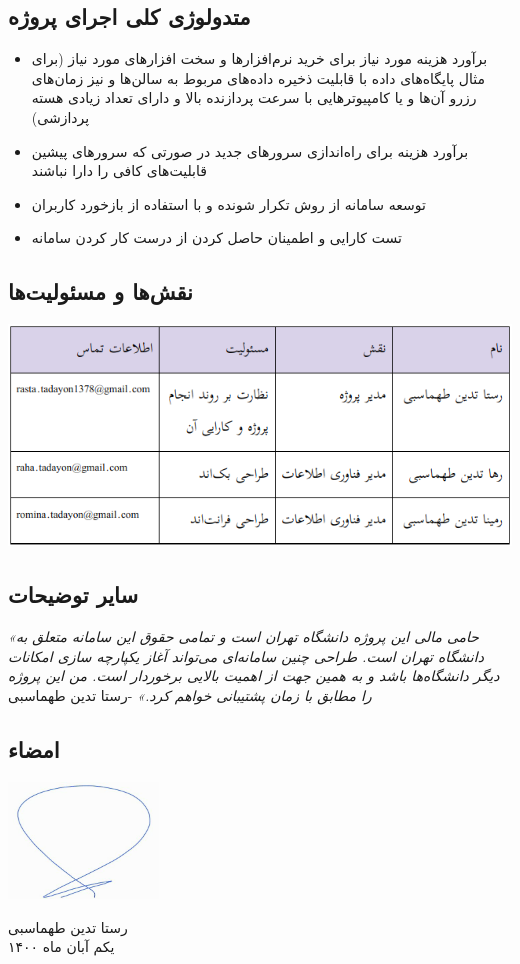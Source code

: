 \subsection*{
متدولوژی کلی اجرای پروژه
}

\begin{itemize}
	\item {
	برآورد هزینه مورد نیاز برای خرید نرم‌افزار‌ها و سخت افزار‌های مورد نیاز (برای مثال پایگاه‌های داده با قابلیت ذخیره داده‌های مربوط به سالن‌ها و نیز زمان‌های رزرو آن‌ها و یا کامپیوتر‌هایی با سرعت پردازنده بالا و دارای تعداد زیادی هسته پردازشی)
	}
	\item {
	برآورد هزینه برای راه‌اندازی سرور‌های جدید در صورتی که سرور‌های پیشین قابلیت‌های کافی را دارا نباشند
	}
	\item {
	توسعه سامانه از روش تکرار شونده و با استفاده از بازخورد کاربران
	}
	\item {
	تست کارایی و اطمینان حاصل کردن از درست کار کردن سامانه
	}
\end{itemize}


\subsection*{
نقش‌ها و مسئولیت‌ها
}

\begin{center}
		
		\includegraphics[width=\linewidth]{appandecies/names_and_jobs.png}
\end{center}


\subsection*{
سایر توضیحات
}

\emph{
«حامی مالی این پروژه دانشگاه تهران است و تمامی حقوق این سامانه متعلق به دانشگاه تهران است. طراحی چنین سامانه‌ای می‌تواند آغاز یکپارچه سازی امکانات دیگر دانشگاه‌ها باشد و به همین جهت از اهمیت بالایی برخوردار است. من این پروژه را مطابق با زمان پشتیبانی‌ خواهم کرد.» 
}
-رستا تدین طهماسبی


\subsection*{
امضاء
}
\hspace*{12cm}\includegraphics[width=4cm]{appandecies/sign.jpg}

\begin{flushleft}
رستا تدین طهماسبی \\
یکم آبان ماه ۱۴۰۰

\end{flushleft}
